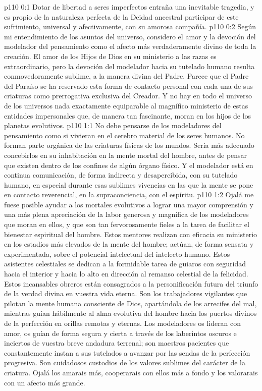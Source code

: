 \author{Mensajero solitario}
\vs p110 0:1 Dotar de libertad a seres imperfectos entraña una inevitable tragedia, y es propio de la naturaleza perfecta de la Deidad ancestral participar de este sufrimiento, universal y afectivamente, con su amorosa compañía.
\vs p110 0:2 Según mi entendimiento de los asuntos del universo, considero el amor y la devoción del modelador del pensamiento como el afecto más verdaderamente divino de toda la creación. El amor de los Hijos de Dios en su ministerio a las razas es extraordinario, pero la devoción del modelador hacia su tutelado humano resulta conmovedoramente sublime, a la manera divina del Padre. Parece que el Padre del Paraíso se ha reservado esta forma de contacto personal con cada una de sus criaturas como prerrogativa exclusiva del Creador. Y no hay en todo el universo de los universos nada exactamente equiparable al magnífico ministerio de estas entidades impersonales que, de manera tan fascinante, moran en los hijos de los planetas evolutivos.
\vs p110 1:1 No debe pensarse de los modeladores del pensamiento como si vivieran en el cerebro material de los seres humanos. No forman parte orgánica de las criaturas físicas de los mundos. Sería más adecuado concebirlos en su inhabitación en la mente mortal del hombre, antes de pensar que existen dentro de los confines de algún órgano físico. Y el modelador está en continua comunicación, de forma indirecta y desapercibida, con su tutelado humano, en especial durante esas sublimes vivencias en las que la mente se pone en contacto reverencial, en la supraconciencia, con el espíritu.
\vs p110 1:2 Ojalá me fuese posible ayudar a los mortales evolutivos a lograr una mayor comprensión y una más plena apreciación de la labor generosa y magnífica de los modeladores que moran en ellos, y que son tan fervorosamente fieles a la tarea de facilitar el bienestar espiritual del hombre. Estos mentores realizan con eficacia su ministerio en los estadios más elevados de la mente del hombre; actúan, de forma sensata y experimentada, sobre el potencial intelectual del intelecto humano. Estos asistentes celestiales se dedican a la formidable tarea de guiaros con seguridad hacia el interior y hacia lo alto en dirección al remanso celestial de la felicidad. Estos incansables obreros están consagrados a la personificación futura del triunfo de la verdad divina en vuestra vida eterna. Son los trabajadores vigilantes que pilotan la mente humana consciente de Dios, apartándola de los arrecifes del mal, mientras guían hábilmente al alma evolutiva del hombre hacia los puertos divinos de la perfección en orillas remotas y eternas. Los modeladores os lideran con amor, os guían de forma segura y cierta a través de los laberintos oscuros e inciertos de vuestra breve andadura terrenal; son maestros pacientes que constantemente instan a sus tutelados a avanzar por las sendas de la perfección progresiva. Son cuidadosos custodios de los valores sublimes del carácter de la criatura. Ojalá los amarais más, cooperarais con ellos más a fondo y los valorarais con un afecto más grande.
